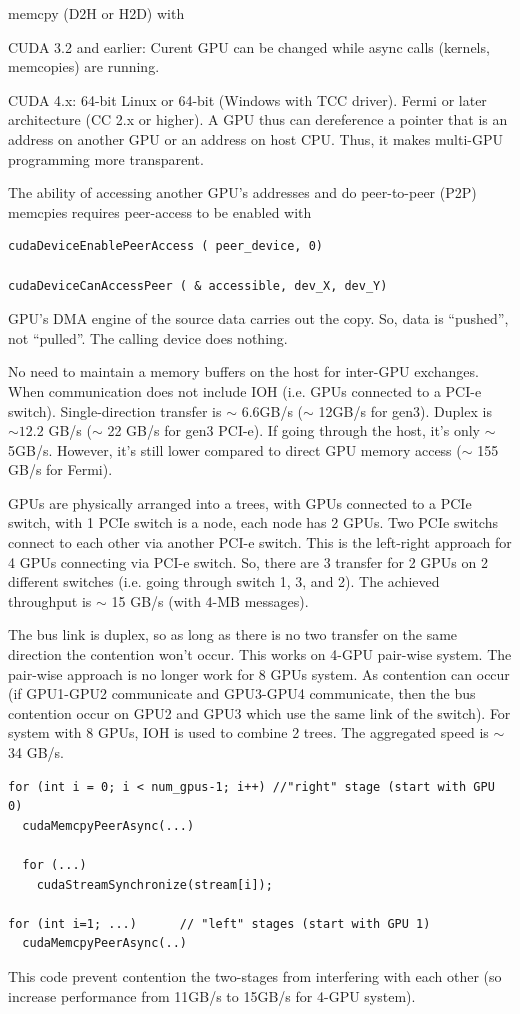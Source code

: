 memcpy (D2H or H2D) with  


CUDA 3.2 and earlier: Curent GPU can be changed while async calls (kernels,
memcopies) are running.


CUDA 4.x: 64-bit Linux or 64-bit (Windows with TCC driver). Fermi or later
architecture (CC 2.x or higher). A GPU thus can dereference a pointer that is an
address on another GPU or an address on host CPU. Thus, it makes multi-GPU
programming more transparent. 

The ability of accessing another GPU's addresses and do peer-to-peer (P2P)
memcpies requires peer-access to be enabled with 
\begin{verbatim}
cudaDeviceEnablePeerAccess ( peer_device, 0)

cudaDeviceCanAccessPeer ( & accessible, dev_X, dev_Y)
\end{verbatim}

GPU's DMA engine of the source data carries out the copy. So, data is
``pushed'', not ``pulled''. The calling device does nothing. 

No need to maintain a memory buffers on the host for inter-GPU exchanges. When
communication does not include IOH (i.e. GPUs connected to a PCI-e switch).
Single-direction transfer is $\sim$ 6.6GB/s ($\sim$ 12GB/s for gen3). Duplex is
$\sim 12.2$ GB/s ($\sim$ 22 GB/s for gen3 PCI-e). If going through the host,
it's only $\sim$ 5GB/s.  However, it's still lower compared to direct GPU memory
access ($\sim$ 155 GB/s for Fermi). 

GPUs are physically arranged into a trees, with GPUs connected to a PCIe switch,
with 1 PCIe switch is a node, each node has 2 GPUs. Two PCIe switchs connect to
each other via another PCI-e switch. This is the left-right approach for 4 GPUs
connecting via PCI-e switch. So, there are 3 transfer for 2 GPUs on 2 different
switches (i.e. going through switch 1, 3, and 2). The achieved throughput is
$\sim$ 15 GB/s (with 4-MB messages). 

The bus link is duplex, so as long as there is no two transfer on the same
direction the contention won't occur. This works on 4-GPU pair-wise system. The
pair-wise approach is no longer work for 8 GPUs system.
As contention can occur (if GPU1-GPU2 communicate and GPU3-GPU4 communicate,
then the bus contention occur on GPU2 and GPU3 which use the same link of the
switch).
For system with 8 GPUs, IOH is used to combine 2 trees.
The aggregated speed is $\sim$ 34 GB/s.
\begin{verbatim}
for (int i = 0; i < num_gpus-1; i++) //"right" stage (start with GPU 0)
  cudaMemcpyPeerAsync(...)
  
  for (...)
    cudaStreamSynchronize(stream[i]);
    
for (int i=1; ...)      // "left" stages (start with GPU 1)
  cudaMemcpyPeerAsync(..)
\end{verbatim}
This code prevent contention the two-stages from interfering with each other
(so increase performance from 11GB/s to 15GB/s for 4-GPU system). 


